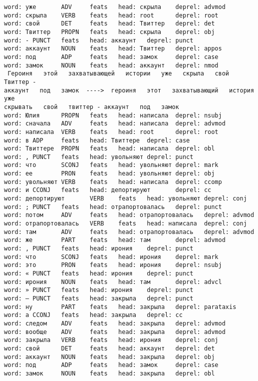\documentclass[11pt]{article}
\begin{document}
\begin{Verbatim}[commandchars=\\\{\}]
word: уже       ADV     feats   head: скрыла    deprel: advmod
word: скрыла    VERB    feats   head: root      deprel: root
word: свой      DET     feats   head: Твиттер   deprel: det
word: Твиттер   PROPN   feats   head: скрыла    deprel: obj
word: - PUNCT   feats   head: аккаунт   deprel: punct
word: аккаунт   NOUN    feats   head: Твиттер   deprel: appos
word: под       ADP     feats   head: замок     deprel: case
word: замок     NOUN    feats   head: аккаунт   deprel: nmod
 Героиня   этой   захватывающей   истории   уже   скрыла   свой   Твиттер -
аккаунт   под   замок  ---->  героиня   этот   захватывающий   история   уже
скрывать   свой   твиттер - аккаунт   под   замок
word: Юлия      PROPN   feats   head: написала  deprel: nsubj
word: сначала   ADV     feats   head: написала  deprel: advmod
word: написала  VERB    feats   head: root      deprel: root
word: в ADP     feats   head: Твиттере  deprel: case
word: Твиттере  PROPN   feats   head: написала  deprel: obl
word: , PUNCT   feats   head: увольняют deprel: punct
word: что       SCONJ   feats   head: увольняют deprel: mark
word: ее        PRON    feats   head: увольняют deprel: obj
word: увольняют VERB    feats   head: написала  deprel: ccomp
word: и CCONJ   feats   head: депортируют       deprel: cc
word: депортируют       VERB    feats   head: увольняют deprel: conj
word: ; PUNCT   feats   head: отрапортовалась   deprel: punct
word: потом     ADV     feats   head: отрапортовалась   deprel: advmod
word: отрапортовалась   VERB    feats   head: написала  deprel: conj
word: там       ADV     feats   head: отрапортовалась   deprel: advmod
word: же        PART    feats   head: там       deprel: advmod
word: , PUNCT   feats   head: ирония    deprel: punct
word: что       SCONJ   feats   head: ирония    deprel: mark
word: это       PRON    feats   head: ирония    deprel: nsubj
word: « PUNCT   feats   head: ирония    deprel: punct
word: ирония    NOUN    feats   head: там       deprel: advcl
word: » PUNCT   feats   head: ирония    deprel: punct
word: – PUNCT   feats   head: закрыла   deprel: punct
word: ну        PART    feats   head: закрыла   deprel: parataxis
word: а CCONJ   feats   head: закрыла   deprel: cc
word: следом    ADV     feats   head: закрыла   deprel: advmod
word: вообще    ADV     feats   head: закрыла   deprel: advmod
word: закрыла   VERB    feats   head: ирония    deprel: conj
word: свой      DET     feats   head: аккаунт   deprel: det
word: аккаунт   NOUN    feats   head: закрыла   deprel: obj
word: под       ADP     feats   head: замок     deprel: case
word: замок     NOUN    feats   head: закрыла   deprel: obl

\end{Verbatim}
\end{document}
